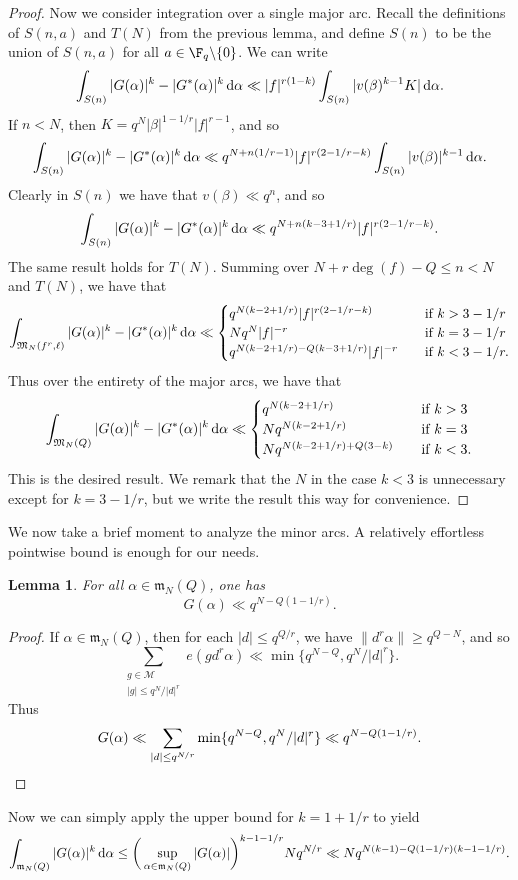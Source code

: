 \documentclass[reqno,11pt]{amsart}
\newtheorem{lemma}[theorem]{Lemma}
\theoremstyle{definition}
\theoremstyle{remark}
\numberwithin{equation}{section}
\def\calM{{\mathcal M}}
\def\setmin{{\setminus\!\,}}
\def\grm{{\mathfrak m}}\def\grM{{\mathfrak M}}\def\grN{{\mathfrak N}}
\renewcommand{\d}{\,{\rm d}} %
\newcommand{\<}{\begin{equation}}
\renewcommand{\>}{\end{equation}}
\begin{document}
\begin{proof}
    Now we consider integration over a single major arc. Recall the definitions of $S(n,a)$ and $T(N)$ from the previous lemma, and define $S(n)$ to be the union of $S(n,a)$ for all $a \in \F_q\setmin\{0\}$. We can write
    \[\int_{S(n)} |G(\alpha)|^k -  |G^*(\alpha)|^k \d\alpha \ll |f|^{r(1-k)}\int_{S(n)} |v(\beta)^{k-1}K| \d\alpha.\]
    If $n<N$, then $K = q^N|\beta|^{1-1/r}|f|^{r-1}$, and so 
    \[\int_{S(n)} |G(\alpha)|^k -  |G^*(\alpha)|^k \d\alpha \ll q^{N+n(1/r-1)}|f|^{r(2-1/r-k)}\int_{S(n)} |v(\beta)|^{k-1} \d\alpha.\]
    Clearly in $S(n)$ we have that $v(\beta) \ll q^n$, and so 
    \[\int_{S(n)} |G(\alpha)|^k -  |G^*(\alpha)|^k \d\alpha \ll q^{N+n(k-3+1/r)}|f|^{r(2-1/r-k)}.\]
    The same result holds for $T(N)$. Summing over $N+r\deg(f)-Q \leq n < N$ and $T(N)$, we have that
    \[\int_{\grM_N(f^r,\ell)} |G(\alpha)|^k -  |G^*(\alpha)|^k \d\alpha \ll \begin{cases}
        q^{N(k-2+1/r)}|f|^{r(2-1/r-k)} \quad &\text{if } k>3-1/r \\
        Nq^N|f|^{-r} \quad &\text{if } k=3-1/r \\
        q^{N(k-2+1/r)-Q(k-3+1/r)}|f|^{-r} \quad &\text{if } k < 3-1/r.
    \end{cases}\]
    Thus over the entirety of the major arcs, we have that
    \[\int_{\grM_N(Q)} |G(\alpha)|^k -  |G^*(\alpha)|^k \d\alpha \ll \begin{cases}
        q^{N(k-2+1/r)} \quad &\text{if } k>3 \\
        Nq^{N(k-2+1/r)} \quad &\text{if } k=3 \\
        Nq^{N(k-2+1/r) + Q(3-k)} \quad &\text{if } k < 3.
    \end{cases}\]
    This is the desired result. We remark that the $N$ in the case $k<3$ is unnecessary except for $k=3-1/r$, but we write the result this way for convenience.
\end{proof}

We now take a brief moment to analyze the minor arcs. A relatively effortless pointwise bound is enough for our needs.
\begin{lemma}
    For all $\alpha \in \grm_N(Q)$, one has
    \[G(\alpha) \ll q^{N-Q(1-1/r)}.\]
\end{lemma}
\begin{proof}
    If $\alpha \in \grm_N(Q)$, then for each $|d| \leq q^{Q/r}$, we have $\|d^r\alpha\| \geq q^{Q-N}$, and so 
    \[\sum_{\substack{g \in \calM \\ |g| \leq q^N/|d|^r}} e(gd^r\alpha) \ll \min\{q^{N-Q},q^N/|d|^r\}.\]
    Thus
    \[G(\alpha) \ll \sum_{|d|\leq q^{N/r}}\min\{q^{N-Q},q^N/|d|^r\} \ll q^{N-Q(1-1/r)}. \qedhere\]
\end{proof}
Now we can simply apply the upper bound for $k=1+1/r$ to yield
\[\int_{\grm_N(Q)} |G(\alpha)|^k \d\alpha \leq \bigg(\sup_{\alpha \in \grm_N(Q)} |G(\alpha)|\bigg)^{k-1-1/r}Nq^{N/r} \ll Nq^{N(k-1)-Q(1-1/r)(k-1-1/r)}.\]
\end{document}
